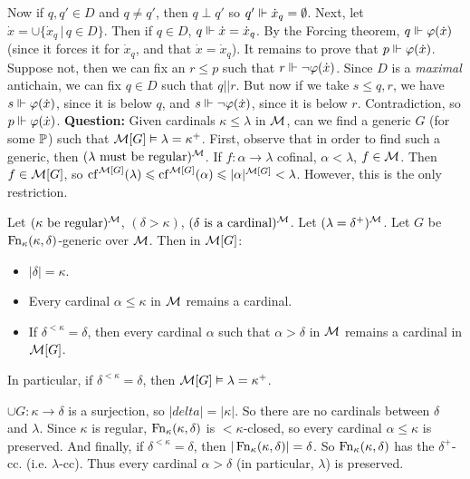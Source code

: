 \documentclass{article}
\begin{document}
    Now if $q,q' \in D$ and $q \neq q'$, then $q \perp q'$ so $q' \Vdash \dot{x}_{q} = \emptyset$. Next, let $\dot{x} = \cup \{ \dot{x}_{q} \, | \, q \in D \}$. Then if $q \in D$, $q \Vdash \dot{x} = \dot{x}_{q}$. By the Forcing theorem, $q \Vdash \varphi(\dot{x})$ (since it forces it for $\dot{x}_{q}$, and that $\dot{x} = \dot{x}_{q}$). \gap
    It remains to prove that $p \Vdash \varphi(\dot{x})$. Suppose not, then we can fix an $r \leq p$ such that $r \Vdash \neg \varphi(\dot{x})$. Since $D$ is a \textit{maximal} antichain, we can fix $q \in D$ such that $q || r$. But now if we take $s \leq q,r$, we have $s \Vdash \varphi(\dot{x})$, since it is below $q$, and $s \Vdash \neg \varphi(\dot{x})$, since it is below $r$. Contradiction, so $p \Vdash \varphi(\dot{x})$. \endproof
    \textbf{Question:} Given cardinals $\kappa \leq \lambda$ in $\mathcal{M}$, can we find a generic $G$ (for some $\mathbb{P}$) such that $\mathcal{M}[G] \vDash \lambda = \kappa^{+}$. \gap
    First, observe that in order to find such a generic, then $(\lambda \text{ must be regular})^{\mathcal{M}}$. If $f : \alpha \to \lambda$ cofinal, $\alpha < \lambda$, $f \in \mathcal{M}$. Then $f \in \mathcal{M}[G]$, so $\operatorname{cf}^{\mathcal{M}[G]}(\lambda) \leqslant  \operatorname{cf}^{\mathcal{M}[G]}(\alpha) \leqslant |\alpha|^{\mathcal{M}[G]} < \lambda$. However, this is the only restriction.
    \begin{fancythm}{}
        Let $(\kappa \text{ be regular})^{\mathcal{M}}$, $(\delta > \kappa)$, $(\delta \text{ is a cardinal})^{\mathcal{M}}$. Let $(\lambda = \delta^{+})^{\mathcal{M}}$. Let $G$ be $\operatorname{Fn}_{\kappa}(\kappa, \delta)$-generic over $\mathcal{M}$. Then in $\mathcal{M}[G]$: \begin{itemize}
            \item $|\delta| = \kappa$.
            \item Every cardinal $\alpha \leq \kappa$ in $\mathcal{M}$ remains a cardinal.
            \item If $\delta^{<\kappa} = \delta$, then every cardinal $\alpha$ such that $\alpha > \delta$ in $\mathcal{M}$ remains a cardinal in $\mathcal{M}[G]$.
        \end{itemize}
        In particular, if $\delta^{<\kappa}= \delta$, then $\mathcal{M}[G] \vDash \lambda = \kappa^{+}$.
    \end{fancythm}
    \proof $\cup G : \kappa \to \delta$ is a surjection, so $|delta| = |\kappa|$. So there are no cardinals between $\delta$ and $\lambda$. \gap
    Since $\kappa$ is regular, $\operatorname{Fn}_{\kappa}(\kappa, \delta)$ is $<\kappa$-closed, so every cardinal $\alpha \leq \kappa$ is preserved. \gap
    And finally, if $\delta^{<\kappa}=\delta$, then $|\operatorname{Fn}_{\kappa}(\kappa, \delta)|=\delta$. So $\operatorname{Fn}_{\kappa}(\kappa,\delta)$ has the $\delta^{+}$-cc. (i.e. $\lambda$-cc). Thus every cardinal $\alpha > \delta$ (in particular, $\lambda$) is preserved. \endproof
\end{document}
